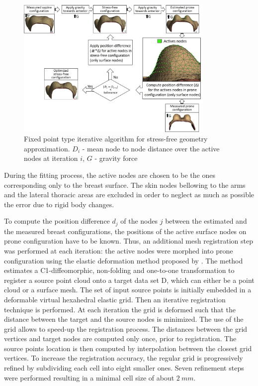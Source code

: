 \begin{figure}[!h]
\centering
\includegraphics[width=0.85\textwidth,keepaspectratio]{figures/stress_free_config_algo.jpg} 
\caption{Fixed point type iterative algorithm for stress-free geometry approximation. $D_i$ - mean node to node distance over the active nodes at iteration $i$, $G$ - gravity force}\label{fig:myfixedpointalgo}
\end{figure}

During the fitting process, the active nodes are chosen to be the ones corresponding only to the breast surface. The skin nodes bellowing to the  arms and the lateral thoracic areas are excluded  in order to neglect as much as possible the error due to rigid body changes.

To compute the position difference $d_j$ of the nodes $j$ between the estimated and the measured breast configurations, the  positions of the active surface nodes on prone configuration have to be known. Thus, an additional mesh registration step was performed at each iteration: the active nodes were morphed into prone configuration using the elastic deformation method proposed by \cite{bucki_fast_2010}. The method estimates a C1-diffeomorphic, non-folding and one-to-one transformation to register a source point cloud onto a target data set D, which can either be a point cloud or a surface mesh.  The set of input source points is initially embedded in a deformable virtual hexahedral elastic grid. Then an iterative registration technique is performed. At each iteration the grid is deformed such that the distance between the target and the source nodes is minimized. The use of the grid allows to speed-up the registration process. The distances between the grid vertices and target nodes are computed only once, prior to registration. The source points location is then computed by interpolation between the closest grid vertices. To increase the registration accuracy, the regular grid is progressively refined by subdividing each cell into eight smaller ones. Seven refinement steps were performed resulting in a minimal cell size of about $2\ mm$. 


